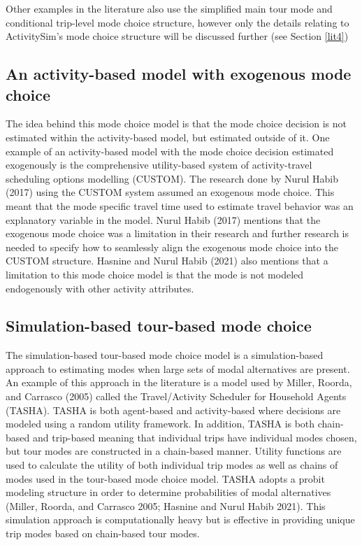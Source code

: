 \documentclass[12pt, oneside, openright]{byuthesis}
\begin{document}
Other examples in the literature also use the simplified main tour mode and conditional trip-level mode choice structure, however only the details relating to ActivitySim's mode choice structure will be discussed further (see Section \ref{lit4})

\hypertarget{lit34}{%
\subsection{An activity-based model with exogenous mode choice}\label{lit34}}

The idea behind this mode choice model is that the mode choice decision is not estimated within the activity-based model, but estimated outside of it. One example of an activity-based model with the mode choice decision estimated exogenously is the comprehensive utility-based system of activity-travel scheduling options modelling (CUSTOM). The research done by Nurul Habib (2017) using the CUSTOM system assumed an exogenous mode choice. This meant that the mode specific travel time used to estimate travel behavior was an explanatory variable in the model. Nurul Habib (2017) mentions that the exogenous mode choice was a limitation in their research and further research is needed to specify how to seamlessly align the exogenous mode choice into the CUSTOM structure. Hasnine and Nurul Habib (2021) also mentions that a limitation to this mode choice model is that the mode is not modeled endogenously with other activity attributes.

\hypertarget{lit35}{%
\subsection{Simulation-based tour-based mode choice}\label{lit35}}

The simulation-based tour-based mode choice model is a simulation-based approach to estimating modes when large sets of modal alternatives are present. An example of this approach in the literature is a model used by Miller, Roorda, and Carrasco (2005) called the Travel/Activity Scheduler for Household Agents (TASHA). TASHA is both agent-based and activity-based where decisions are modeled using a random utility framework. In addition, TASHA is both chain-based and trip-based meaning that individual trips have individual modes chosen, but tour modes are constructed in a chain-based manner. Utility functions are used to calculate the utility of both individual trip modes as well as chains of modes used in the tour-based mode choice model. TASHA adopts a probit modeling structure in order to determine probabilities of modal alternatives (Miller, Roorda, and Carrasco 2005; Hasnine and Nurul Habib 2021). This simulation approach is computationally heavy but is effective in providing unique trip modes based on chain-based tour modes.
\end{document}
